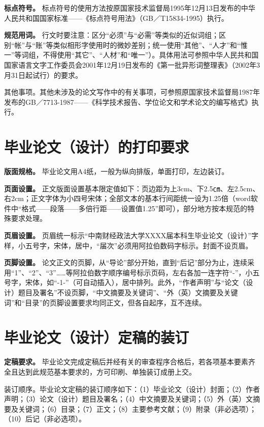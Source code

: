 \documentclass[singlesided]{Style/ucasthesis}%
\begin{document}
\textbf{标点符号。} 标点符号的使用方法按原国家技术监督局1995年12月13日发布的中华人民共和国国家标准------《标点符号用法》（GB／T15834-1995）执行。

\textbf{规范用词。} 行文时要注意：区分``必须''与``必需''等类似的近似词组；区别``帐''与``账''等类似相形字使用时的微妙差别；统一使用``其他''、``人才''和``惟一''等词组，不得使用``其它''、``人材''和``唯一''）。具体用法可参照中华人民共和国国家语言文字工作委员会2001年12月19日发布的《第一批异形词整理表》（2002年3月31日起试行）的要求。

其他事项。其他未涉及的论文写作中的有关事项，可参照原国家技术监督局1987年发布的GB／7713-1987------《科学技术报告、学位论文和学术论文的编写格式》执行。

\hypertarget{section-32}{%
\section{毕业论文（设计）的打印要求}\label{section-32}}

\textbf{版面规格。} 毕业论文用A4纸，一般为纵向排版，单面打印，左边装订。

\textbf{页面设置。} 正文版面设置基本限定值如下：页边距为上3cm、下2.5㎝、左2.5cm、右2cm；正文字体为小四号宋体；全部文本的基本行间距统一设为1.25倍（word软件中``格式------段落------多倍行距------设置值1.25''即可），部分地方按本规范的特殊要求处理。

\textbf{页眉设置。} 页眉统一标示``中南财经政法大学XXXX届本科生毕业论文（设计）''字样，小五号字，宋体，居中，``届次''必须用阿拉伯数码字标示。封面不设页眉。

\textbf{页脚设置。} 论文正文的页脚，从``导论''部分开始，直到``后记''部分为止，连续采用``1''、``2''、``3''\ldots{}\ldots{}等阿拉伯数字顺序编号标示页码，左右各加一连字符``-''，小五号字，宋体，如``-1-''（可自动插入），居中排列。此外，``作者声明''与``论文（设计）题目及署名''不设页脚，``中文摘要及关键词''、``外（英）文摘要及关键词''和``目录''的页脚设置要求均同正文，但各自起序，互不连续。

\hypertarget{section-33}{%
\section{毕业论文（设计）定稿的装订}\label{section-33}}

\textbf{定稿要求。} 毕业论文完成定稿后并经有关的审查程序合格后，若各项基本要素齐全且达到此规范基本要求的，方可印刷、单独装订成册上交。

装订顺序。毕业论文定稿的装订顺序如下：（1）毕业论文（设计）封面；（2）作者声明；（3）论文（设计）题目及署名；（4）中文摘要及关键词；（5）外（英）文摘要及关键词；（6）目录；（7）正文；（8）主要参考文献；（9）附录（非必选项）；（10）后记（非必选项）。
\end{document}
